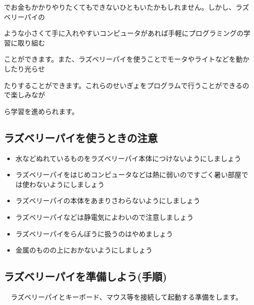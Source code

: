 \documentclass[a4paper,12pt]{jarticle}
\begin{document}
でお金もかかりやりたくてもできないひともいたかもしれません。しかし、ラズベリーパイの

ような小さくて手に入れやすいコンピュータがあれば手軽にプログラミングの学習に取り組む

ことができます。また、ラズベリーパイを使うことでモータやライトなどを動かしたり光らせ

たりすることができます。これらのせいぎょをプログラムで行うことができるので楽しみなが

ら学習を進められます。

\subsection{ラズベリーパイを使うときの注意}
\begin{itemize}
\item
水などぬれているものをラズベリーパイ本体につけないようにしましょう
\end{itemize}
\begin{itemize}
\item
ラズベリーパイをはじめコンピュータなどは熱に弱いのですごく暑い部屋では使わないようにしましょう
\end{itemize}
\begin{itemize}
\item
ラズベリーパイの本体をあまりさわらないようにしましょう
\item
ラズベリーパイなどは静電気によわいので注意しましょう
\end{itemize}
\begin{itemize}
\item
ラズベリーパイをらんぼうに扱うのはやめましょう
\end{itemize}
\begin{itemize}
\item
金属のものの上におかないようにしましょう
\end{itemize}

\clearpage

\subsection{ラズベリーパイを準備しよう(手順)}
\ \ ラズベリーパイとキーボード、マウス等を接続して起動する準備をします。
\end{document}
